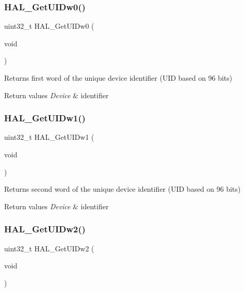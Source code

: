 \subsubsection{\texorpdfstring{HAL\_GetUIDw0()}{HAL\_GetUIDw0()}}
{\footnotesize\ttfamily uint32\+\_\+t H\+A\+L\+\_\+\+Get\+U\+I\+Dw0 (\begin{DoxyParamCaption}\item[{void}]{ }\end{DoxyParamCaption})}



Returns first word of the unique device identifier (U\+ID based on 96 bits) 


\begin{DoxyRetVals}{Return values}
{\em Device} & identifier \\
\hline
\end{DoxyRetVals}
\mbox{\label{group___h_a_l___exported___functions___group2_ga52720dd92ed2bd4314a2a129855d766c}} 
\subsubsection{\texorpdfstring{HAL\_GetUIDw1()}{HAL\_GetUIDw1()}}
{\footnotesize\ttfamily uint32\+\_\+t H\+A\+L\+\_\+\+Get\+U\+I\+Dw1 (\begin{DoxyParamCaption}\item[{void}]{ }\end{DoxyParamCaption})}



Returns second word of the unique device identifier (U\+ID based on 96 bits) 


\begin{DoxyRetVals}{Return values}
{\em Device} & identifier \\
\hline
\end{DoxyRetVals}
\mbox{\label{group___h_a_l___exported___functions___group2_ga5785ae5ec8d4c5a7dadb1359f0778700}} 
\subsubsection{\texorpdfstring{HAL\_GetUIDw2()}{HAL\_GetUIDw2()}}
{\footnotesize\ttfamily uint32\+\_\+t H\+A\+L\+\_\+\+Get\+U\+I\+Dw2 (\begin{DoxyParamCaption}\item[{void}]{ }\end{DoxyParamCaption})}



